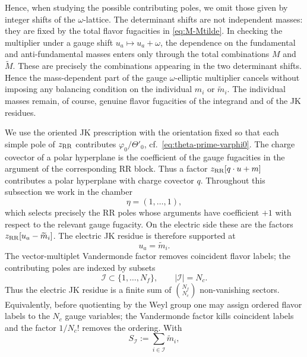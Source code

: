 \documentclass[11pt,a4paper]{article}
\numberwithin{equation}{section}
\theoremstyle{plain}
\theoremstyle{definition}
\theoremstyle{remark}
\begin{document}
Hence, when studying the possible contributing poles, we omit those given by integer shifts of the $\omega$-lattice. The determinant shifts are not independent masses: they are fixed by the total flavor fugacities in \eqref{eq:M-Mtilde}.  In checking the multiplier under a gauge shift \(u_a\mapsto u_a+\omega\), the dependence on the fundamental and anti-fundamental masses enters only through the total combinations \(M\) and \(\widetilde M\). These are precisely the combinations appearing in the two determinant shifts. Hence the mass-dependent part of the gauge \(\omega\)-elliptic multiplier cancels without imposing any balancing condition on the individual \(m_i\) or \(\widetilde m_i\). The individual masses remain, of course, genuine flavor fugacities of the integrand and of the JK residues.

We use the oriented JK prescription with the orientation fixed so that each simple pole of
\(z_{\rm RR}\) contributes \(\varphi_0/\Theta'_0\), cf.~\eqref{eq:theta-prime-varphi0}.  The charge covector of a polar hyperplane is the coefficient of the gauge fugacities in the argument of the corresponding RR block.  Thus a factor \(z_{\rm RR}[q\cdot u+m]\) contributes a polar hyperplane with charge covector \(q\).  Throughout this subsection we work in the chamber
\begin{equation}
\eta=(1,\ldots,1),
\label{eq:UNc-selected-chamber}
\end{equation}
which selects precisely the RR poles whose arguments have coefficient \(+1\) with respect to the relevant gauge fugacity.  On the electric side these are the factors \(z_{\rm RR}[u_a-\widetilde m_i]\).  The electric JK residue is therefore supported at
\begin{equation}
u_a=\widetilde m_i .
\end{equation}
The vector-multiplet Vandermonde factor removes coincident flavor labels; the contributing poles are indexed by subsets
\begin{equation}
\mathcal I\subset\{1,\ldots,N_f\},
\qquad
|\mathcal I|=N_c .
\end{equation}
Thus the electric JK residue is a finite sum of \(\binom{N_f}{N_c}\) non-vanishing sectors.  Equivalently, before quotienting by the Weyl group one may assign ordered flavor labels to the \(N_c\) gauge variables; the Vandermonde factor kills coincident labels and the factor \(1/N_c!\) removes the ordering.
With
\begin{equation}
S_{\mathcal I}:=\sum_{i\in\mathcal I}\widetilde m_i,
\end{equation}
\end{document}
